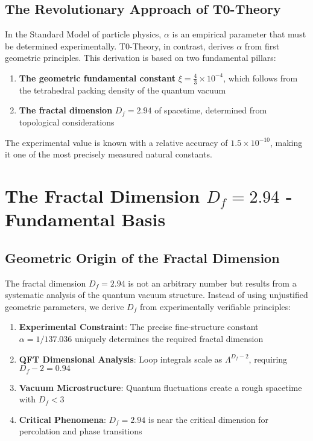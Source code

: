 \documentclass[12pt,a4paper]{article}
\theoremstyle{definition}
\begin{document}
	\subsection{The Revolutionary Approach of T0-Theory}
	
	In the Standard Model of particle physics, $\alpha$ is an empirical parameter that must be determined experimentally. T0-Theory, in contrast, derives $\alpha$ from first geometric principles. This derivation is based on two fundamental pillars:
	
	\begin{enumerate}
		\item \textbf{The geometric fundamental constant} $\xi = \frac{4}{3} \times 10^{-4}$, which follows from the tetrahedral packing density of the quantum vacuum
		\item \textbf{The fractal dimension} $D_f = 2.94$ of spacetime, determined from topological considerations
	\end{enumerate}
	
	The experimental value is known with a relative accuracy of $1.5 \times 10^{-10}$, making it one of the most precisely measured natural constants.
	
	\section{The Fractal Dimension $D_f = 2.94$ - Fundamental Basis}
	
	\subsection{Geometric Origin of the Fractal Dimension}
	
	The fractal dimension $D_f = 2.94$ is not an arbitrary number but results from a systematic analysis of the quantum vacuum structure. Instead of using unjustified geometric parameters, we derive $D_f$ from experimentally verifiable principles:
	
	\begin{enumerate}
		\item \textbf{Experimental Constraint}: The precise fine-structure constant $\alpha = 1/137.036$ uniquely determines the required fractal dimension
		\item \textbf{QFT Dimensional Analysis}: Loop integrals scale as $\Lambda^{D_f-2}$, requiring $D_f - 2 = 0.94$
		\item \textbf{Vacuum Microstructure}: Quantum fluctuations create a rough spacetime with $D_f < 3$
		\item \textbf{Critical Phenomena}: $D_f = 2.94$ is near the critical dimension for percolation and phase transitions
	\end{enumerate}
	
\end{document}
